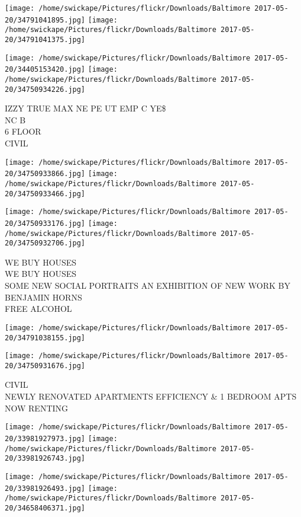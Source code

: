 \documentclass[10pt,letterpaper]{article}
\begin{document}
\texttt{[image: /home/swickape/Pictures/flickr/Downloads/Baltimore 2017-05-20/34791041895.jpg]}
\texttt{[image: /home/swickape/Pictures/flickr/Downloads/Baltimore 2017-05-20/34791041375.jpg]}

\texttt{[image: /home/swickape/Pictures/flickr/Downloads/Baltimore 2017-05-20/34405153420.jpg]}
\texttt{[image: /home/swickape/Pictures/flickr/Downloads/Baltimore 2017-05-20/34750934226.jpg]}

IZZY TRUE MAX NE PE UT EMP C YE\$\\
NC B\\
6 FLOOR\\
CIVIL
\pagebreak

\texttt{[image: /home/swickape/Pictures/flickr/Downloads/Baltimore 2017-05-20/34750933866.jpg]}
\texttt{[image: /home/swickape/Pictures/flickr/Downloads/Baltimore 2017-05-20/34750933466.jpg]}

\texttt{[image: /home/swickape/Pictures/flickr/Downloads/Baltimore 2017-05-20/34750933176.jpg]}
\texttt{[image: /home/swickape/Pictures/flickr/Downloads/Baltimore 2017-05-20/34750932706.jpg]}

WE BUY HOUSES\\
WE BUY HOUSES\\
SOME NEW SOCIAL PORTRAITS AN EXHIBITION OF NEW WORK BY BENJAMIN HORNS\\
FREE ALCOHOL
\pagebreak

\texttt{[image: /home/swickape/Pictures/flickr/Downloads/Baltimore 2017-05-20/34791038155.jpg]}

\vspace{0.25in}
\texttt{[image: /home/swickape/Pictures/flickr/Downloads/Baltimore 2017-05-20/34750931676.jpg]}

CIVIL\\
NEWLY RENOVATED APARTMENTS EFFICIENCY \& 1 BEDROOM APTS NOW RENTING
\pagebreak

\texttt{[image: /home/swickape/Pictures/flickr/Downloads/Baltimore 2017-05-20/33981927973.jpg]}
\texttt{[image: /home/swickape/Pictures/flickr/Downloads/Baltimore 2017-05-20/33981926743.jpg]}

\texttt{[image: /home/swickape/Pictures/flickr/Downloads/Baltimore 2017-05-20/33981926493.jpg]}
\texttt{[image: /home/swickape/Pictures/flickr/Downloads/Baltimore 2017-05-20/34658406371.jpg]}
\end{document}
